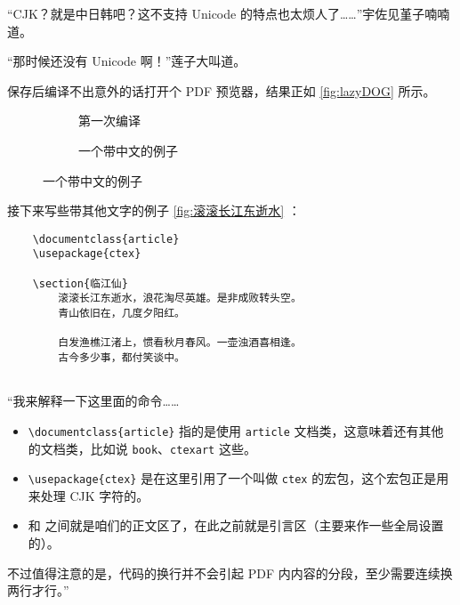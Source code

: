 “CJK？就是中日韩吧？这不支持 Unicode 的特点也太烦人了……”宇佐见堇子喃喃道。

“那时候还没有 Unicode 啊！”莲子大叫道。

保存后编译不出意外的话打开个 PDF 预览器，结果正如 \autoref{fig:lazyDOG} 所示。

\begin{figure}[t]
    \centering
    \begin{subfigure}[t]{0.4\textwidth} \centering
        \caption{第一次编译}
        \label{fig:lazyDOG}
    \end{subfigure}\quad
    \begin{subfigure}[t]{0.4\textwidth} \centering
        \caption{一个带中文的例子}
        \label{fig:滚滚长江东逝水}
    \end{subfigure}
\end{figure}

接下来写些带其他文字的例子 \autoref{fig:滚滚长江东逝水} ：

\begin{lstlisting}
    \documentclass{article}
    \usepackage{ctex}
    
    \section{临江仙}
        滚滚长江东逝水，浪花淘尽英雄。是非成败转头空。
        青山依旧在，几度夕阳红。

        白发渔樵江渚上，惯看秋月春风。一壶浊酒喜相逢。
        古今多少事，都付笑谈中。    
    
\end{lstlisting}

“我来解释一下这里面的命令……

\begin{itemize}
    \item \verb"\documentclass{article}" 指的是使用 \verb"article" 文档类，这意味着还有其他的文档类，比如说 \verb"book"、\verb"ctexart" 这些。
    \item \verb"\usepackage{ctex}" 是在这里引用了一个叫做 \verb"ctex" 的宏包，这个宏包正是用来处理 CJK 字符的。
    \item \verb"" 和 \verb"" 之间就是咱们的正文区了，在此之前就是引言区（主要来作一些全局设置的）。
\end{itemize}

不过值得注意的是，代码的换行并不会引起 PDF 内内容的分段，至少需要连续换两行才行。”

